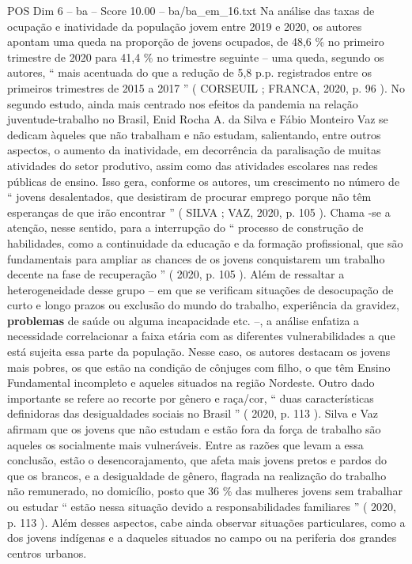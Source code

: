 \begin{textsample}{POS Dim 6 – ba – Score 10.00 – ba/ba\_em\_16.txt}
Na análise das taxas de ocupação e inatividade da população jovem entre 2019 e 2020, os autores apontam uma queda na proporção de jovens ocupados, de 48,6 \% no primeiro trimestre de 2020 para 41,4 \% no trimestre seguinte – uma queda, segundo os autores, “ mais acentuada do que a redução de 5,8 p.p. registrados entre os primeiros trimestres de 2015 a 2017 ” ( CORSEUIL ; FRANCA, 2020, p. 96 ).
No segundo estudo, ainda mais centrado nos efeitos da pandemia na relação juventude-trabalho no Brasil, Enid Rocha A. da Silva e Fábio Monteiro Vaz se dedicam àqueles que não trabalham e não estudam, salientando, entre outros aspectos, o aumento da inatividade, em decorrência da paralisação de muitas atividades do setor produtivo, assim como das atividades escolares nas redes públicas de ensino.
Isso gera, conforme os autores, um crescimento no número de “ jovens desalentados, que desistiram de procurar emprego porque não têm esperanças de que irão encontrar ” ( SILVA ; VAZ, 2020, p. 105 ).
Chama -se a atenção, nesse sentido, para a interrupção do “ processo de construção de habilidades, como a continuidade da educação e da formação profissional, que são fundamentais para ampliar as chances de os jovens conquistarem um trabalho decente na fase de recuperação ” ( 2020, p. 105 ).
Além de ressaltar a heterogeneidade desse grupo – em que se verificam situações de desocupação de curto e longo prazos ou exclusão do mundo do trabalho, experiência da gravidez, \textbf{problemas} de saúde ou alguma incapacidade etc. –, a análise enfatiza a necessidade correlacionar a faixa etária com as diferentes vulnerabilidades a que está sujeita essa parte da população.
Nesse caso, os autores destacam os jovens mais pobres, os que estão na condição de cônjuges com filho, o que têm Ensino Fundamental incompleto e aqueles situados na região Nordeste.
Outro dado importante se refere ao recorte por gênero e raça/cor, “ duas características definidoras das desigualdades sociais no Brasil ” ( 2020, p. 113 ).
Silva e Vaz afirmam que os jovens que não estudam e estão fora da força de trabalho são aqueles os socialmente mais vulneráveis.
Entre as razões que levam a essa conclusão, estão o desencorajamento, que afeta mais jovens pretos e pardos do que os brancos, e a desigualdade de gênero, flagrada na realização do trabalho não remunerado, no domicílio, posto que 36 \% das mulheres jovens sem trabalhar ou estudar “ estão nessa situação devido a responsabilidades familiares ” ( 2020, p. 113 ).
Além desses aspectos, cabe ainda observar situações particulares, como a dos jovens indígenas e a daqueles situados no campo ou na periferia dos grandes centros urbanos.

\end{textsample}
